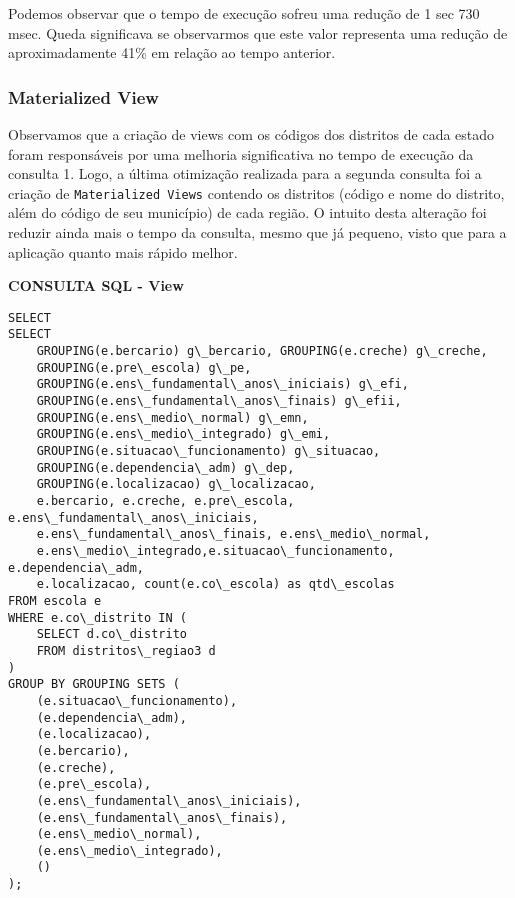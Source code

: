 \documentclass[12pt,a4paper]{article}
\begin{document}
Podemos observar que o tempo de execução sofreu uma redução de 1 sec 730 msec. Queda significava se observarmos que este valor representa uma redução de aproximadamente 41\% em relação ao tempo anterior.


\subsubsection{Materialized View}

Observamos que a criação de views com os códigos dos distritos de cada estado foram responsáveis por uma melhoria significativa no tempo de execução da consulta 1. Logo, a última otimização realizada para a segunda consulta foi a criação de \texttt{Materialized Views} contendo os distritos (código e nome do distrito, além do código de seu município) de cada região. O intuito desta alteração foi reduzir ainda mais o tempo da consulta, mesmo que já pequeno, visto que para a aplicação quanto mais rápido melhor.

\vspace{0.5cm}

\begin{flushleft}
\textbf{CONSULTA SQL - View}\\
\end{flushleft}

\begin{Verbatim}[commandchars=\\\{\}]
SELECT
SELECT
    GROUPING(e.bercario) g\_bercario, GROUPING(e.creche) g\_creche, 
    GROUPING(e.pre\_escola) g\_pe,
    GROUPING(e.ens\_fundamental\_anos\_iniciais) g\_efi,
    GROUPING(e.ens\_fundamental\_anos\_finais) g\_efii, 
    GROUPING(e.ens\_medio\_normal) g\_emn,
    GROUPING(e.ens\_medio\_integrado) g\_emi, 
    GROUPING(e.situacao\_funcionamento) g\_situacao,
    GROUPING(e.dependencia\_adm) g\_dep, 
    GROUPING(e.localizacao) g\_localizacao,
    e.bercario, e.creche, e.pre\_escola, e.ens\_fundamental\_anos\_iniciais,
    e.ens\_fundamental\_anos\_finais, e.ens\_medio\_normal,
    e.ens\_medio\_integrado,e.situacao\_funcionamento, e.dependencia\_adm, 
    e.localizacao, count(e.co\_escola) as qtd\_escolas
FROM escola e
WHERE e.co\_distrito IN (
    SELECT d.co\_distrito
    FROM distritos\_regiao3 d
)
GROUP BY GROUPING SETS (
    (e.situacao\_funcionamento),
    (e.dependencia\_adm),
    (e.localizacao),
    (e.bercario),
    (e.creche),
    (e.pre\_escola),
    (e.ens\_fundamental\_anos\_iniciais),
    (e.ens\_fundamental\_anos\_finais),
    (e.ens\_medio\_normal),
    (e.ens\_medio\_integrado),
    ()
);
\end{Verbatim}
\end{document}
